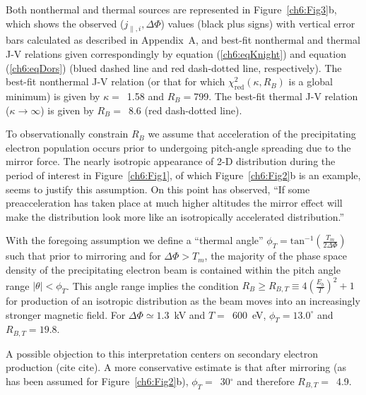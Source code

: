  Both nonthermal and thermal sources are represented in
  Figure~\ref{ch6:Fig3}b, which shows the observed ($j_{\parallel,i},
  \Delta \Phi$) values (black plus signs) with vertical error bars
  calculated as described in Appendix~A, and best-fit nonthermal and
  thermal J-V relations given correspondingly by equation
  (\ref{ch6:eqKnight}) and equation (\ref{ch6:eqDors}) (blued dashed line and
  red dash-dotted line, respectively). The best-fit nonthermal J-V
  relation (or that for which $\chi^2_{\textrm{red}} ( \kappa, R_B )$
  is a global minimum) is given by $\kappa =$~1.58 and $R_B =$799. The
  best-fit thermal J-V relation ($\kappa \rightarrow \infty$) is given
  by $R_B =$~8.6 (red dash-dotted line).


  To observationally constrain $R_B$ we assume that acceleration of
  the precipitating electron population occurs prior to undergoing
  pitch-angle spreading due to the mirror force. The nearly isotropic
  appearance of 2-D distribution during the period of interest in
  Figure~\ref{ch6:Fig1}, of which Figure~\ref{ch6:Fig2}b is an
  example, seems to justify this assumption. On this point
  \citet{Bostrom2003a} has observed, ``If some preacceleration has
  taken place at much higher altitudes the mirror effect will make the
  distribution look more like an isotropically accelerated
  distribution.''

  With the foregoing assumption we define a ``thermal angle'' $\phi_T
  = \textrm{tan}^{-1} ( \frac{T_m}{2 \Delta \Phi} )$ such that prior
  to mirroring and for $\Delta \Phi > T_m$, the majority of the phase
  space density of the precipitating electron beam is contained within
  the pitch angle range $ \vert \theta \vert < \phi_T$.  This angle
  range implies the condition $R_B \geq R_{B,T} \equiv 4 (
  \frac{E_b}{T} )^2 + 1$ for production of an isotropic distribution
  as the beam moves into an increasingly stronger magnetic field. For
  $\Delta \Phi \simeq 1.3$~kV and $T =$~600~eV, $\phi_T = 13.0^\circ$
  and $R_{B,T} = 19.8$.

  A possible objection to this interpretation centers on secondary
  electron production (cite cite). A more conservative estimate is
  that after mirroring (as has been assumed for
  Figure~\ref{ch6:Fig2}b), $\phi_T =$~30$^\circ$ and therefore $R_{B,T}
  =$~4.9.

